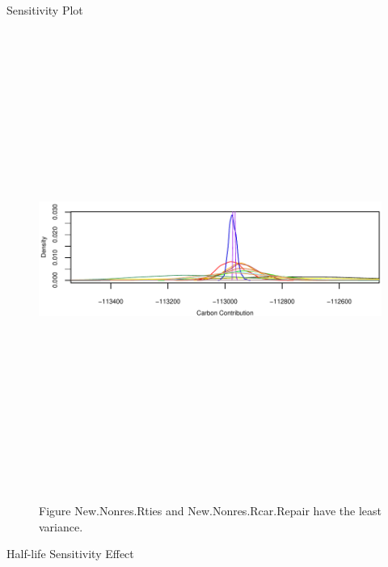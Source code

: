 \documentclass[final]{beamer}\usepackage[]{graphicx}\usepackage[]{color}
\newlength{\onecolwid}
\begin{document}
\begin{frame}[t]
\begin{columns}[t]
\begin{column}{\onecolwid}
\begin{block}{Sensitivity Plot}
\begin{center}
\vspace{-2cm}
\begin{figure}
    {\includegraphics[width=1\linewidth,height=15cm]{CopyOfHLSensitivityGraph.pdf}}
    \caption{Figure New.Nonres.Rties and New.Nonres.Rcar.Repair have the least variance.}
\end{figure}
\end{center}
\end{block}

\begin{block}{Half-life Sensitivity Effect}
\begin{center}


\end{center}
\end{block}
\end{column}
\end{columns}
\end{frame}
\end{document}
